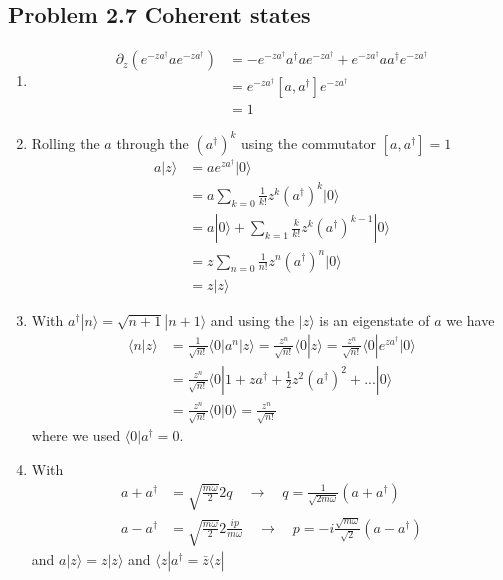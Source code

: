 \documentclass[10pt,a4paper]{book}
\theoremstyle{definition}
\begin{document}
\subsection{Problem 2.7 Coherent states}
\begin{enumerate}
\item 
\begin{align}
    \partial_z\left(e^{-za^\dagger} a e^{-za^\dagger}\right)
    &=-e^{-za^\dagger}a^\dagger a e^{-za^\dagger}+e^{-za^\dagger} a a^\dagger e^{-za^\dagger}\\
    &=e^{-za^\dagger} [a,a^\dagger] e^{-za^\dagger}\\
    &=1
\end{align}
\item Rolling the $a$ through the $(a^\dagger)^k$ using the commutator $[a,a^\dagger]=1$
\begin{align}
    a|z\rangle
    &=a e^{za^\dagger}|0\rangle\\
    &=a\sum_{k=0}\frac{1}{k!}z^k(a^\dagger)^k|0\rangle\\
    &=a|0\rangle+\sum_{k=1}\frac{k}{k!}z^k(a^\dagger)^{k-1}|0\rangle\\
    &=z\sum_{n=0}\frac{1}{n!}z^n(a^\dagger)^{n}|0\rangle\\
    &=z|z\rangle
\end{align}
\item With $a^\dagger|n\rangle=\sqrt{n+1}|n+1\rangle$ and using the $|z\rangle$ is an eigenstate of $a$ we have
\begin{align}
    \langle n|z\rangle&=\frac{1}{\sqrt{n!}}\langle0|a^n|z\rangle
    =\frac{z^n}{\sqrt{n!}}\langle0|z\rangle
    =\frac{z^n}{\sqrt{n!}}\langle0|e^{za^\dagger}|0\rangle\\
    &=\frac{z^n}{\sqrt{n!}}\langle0|1+za^\dagger+\frac{1}{2}z^2(a^\dagger)^2+...|0\rangle\\
    &=\frac{z^n}{\sqrt{n!}}\langle0|0\rangle
    =\frac{z^n}{\sqrt{n!}}
\end{align}
where we used $\langle0|a^\dagger=0$.
\item With
\begin{align}
    a+a^\dagger&=\sqrt{\frac{m\omega}{2}}2q\quad\rightarrow\quad q=\frac{1}{\sqrt{2m\omega}}(a+a^\dagger)\\
    a-a^\dagger&=\sqrt{\frac{m\omega}{2}}2\frac{ip}{m\omega}\quad\rightarrow\quad p=-i\frac{\sqrt{m\omega}}{\sqrt{2}}(a-a^\dagger)
\end{align}
and $a|z\rangle=z|z\rangle$ and $\langle z|a^\dagger=\bar{z}\langle z|$ 
\begin{align}

\end{align}
\end{enumerate}
\end{document}
